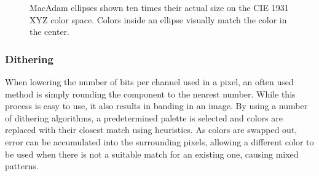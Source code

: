 \documentclass[12pt]{CPP}
\begin{document}
\begin{figure}[!htbp]
\begin{center}
\caption{MacAdam ellipses shown ten times their actual size on the CIE 1931 XYZ color space. Colors inside an ellipse visually match the color in the center.}
\end{center}
\end{figure}

\subsubsection{Dithering}
When lowering the number of bits per channel used in a pixel, an often used method is simply rounding the component to the nearest number. While this process is easy to use, it also results in banding in an image. By using a number of dithering algorithms, a predetermined palette is selected and colors are replaced with their closest match using heuristics. As colors are swapped out, error can be accumulated into the surrounding pixels, allowing a different color to be used when there is not a suitable match for an existing one, causing mixed patterns.
\end{document}
